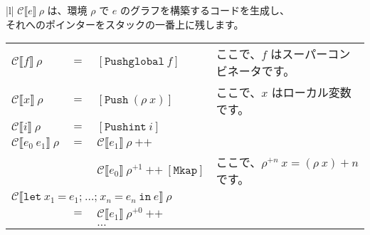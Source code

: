 \documentclass{jarticle}
\begin{document}
\begin{tabular} {|l|} \hline
	$\mathcal{C} \llbracket e \rrbracket ~ \rho$ は、環境 $\rho$ で $e$ のグラフを構築するコードを生成し、 \\
	それへのポインターをスタックの一番上に残します。                                                       \\
	\begin{tabular}{l c l l}
		$\mathcal{C} \llbracket f \rrbracket ~ \rho$         & $=$ & $\left[\texttt{Pushglobal} ~ f \right]$                                                         & ここで、$f$ はスーパーコンビネータです。                                                             \\
		$\mathcal{C} \llbracket x \rrbracket ~ \rho$         & $=$ & $\left[\texttt{Push} ~ (\rho ~ x) \right]$                                                      & ここで、$x$ はローカル変数です。                                                                     \\
		$\mathcal{C} \llbracket i \rrbracket ~ \rho$         & $=$ & $\left[\texttt{Pushint} ~ i \right]$                                                            &                                                                                                      \\
		$\mathcal{C} \llbracket e_0 ~ e_1 \rrbracket ~ \rho$ & $=$ & $\mathcal{C} \llbracket e_1 \rrbracket ~ \rho ~ \texttt{++}$                                    &                                                                                                      \\
		                                                     &     & $\mathcal{C} \llbracket e_0 \rrbracket ~ \rho^{+1} ~ \texttt{++} ~ \left[\texttt{Mkap} \right]$ & ここで、$\rho^{+n} ~ x = (\rho ~ x) + n$ です。                                                      \\
		\multicolumn{4}{l}{$\mathcal{C} \llbracket \texttt{let} ~ x_1 ~ \texttt{=} ~ e_1\texttt{;} ~  \ldots \texttt{;} ~ x_n ~ \texttt{=} ~ e_n ~ \texttt{in} ~ e \rrbracket ~ \rho$}                                                                                      \\
		                                                     & $=$ & $\mathcal{C} \llbracket e_1 \rrbracket ~ \rho^{+0} ~ \texttt{++}$                               &                                                                                                      \\
		                                                     &     & $\ldots$                                                                                        &                                                                                                      \\

\end{tabular}
\end{tabular}
\end{document}
